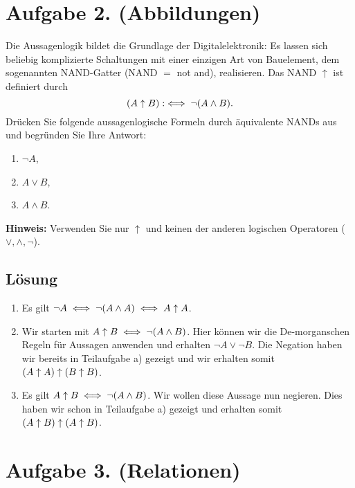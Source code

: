 \documentclass[german,12pt]{homework}
\DeclarePairedDelimiter{\enbrace}{(}{)}
\begin{document}
    \section*{Aufgabe 2. (Abbildungen)}

    \begin{problem}
        Die Aussagenlogik bildet die Grundlage der Digitalelektronik: Es lassen sich beliebig komplizierte Schaltungen mit einer einzigen Art von Bauelement, dem sogenannten NAND-Gatter (NAND \(=\) not and), realisieren. Das NAND \(\uparrow\) ist definiert durch
        \[\enbrace*{A \uparrow B} :\iff \lnot\enbrace*{A \land B}.\]
        Drücken Sie folgende aussagenlogische Formeln durch äquivalente NANDs aus und begründen Sie Ihre Antwort:
        \begin{enumerate}
            \item \({\lnot}A\),
            \item \(A \lor B\),
            \item \(A \land B\).
        \end{enumerate}

        \textbf{Hinweis:} \quad Verwenden Sie nur \(\uparrow\) und keinen der anderen logischen Operatoren (\(\lor, \land, \lnot\)).
    \end{problem}

    \subsection*{Lösung}
    \begin{enumerate}
        \item Es gilt \(\lnot{A} \iff \lnot\enbrace*{A \land A} \iff A \uparrow A\).
        \item Wir starten mit \(A \uparrow B \iff \lnot\enbrace*{A \land B}\). Hier können wir die De-morganschen Regeln für Aussagen anwenden und erhalten \(\lnot{A} \lor \lnot{B}\). Die Negation haben wir bereits in Teilaufgabe a) gezeigt und wir erhalten somit \(\enbrace*{A \uparrow A} \uparrow \enbrace*{B \uparrow B}\).
        \item Es gilt \(A \uparrow B \iff \lnot\enbrace*{A \land B}\). Wir wollen diese Aussage nun negieren. Dies haben wir schon in Teilaufgabe a) gezeigt und erhalten somit \(\enbrace*{A \uparrow B} \uparrow \enbrace*{A \uparrow B}\).
    \end{enumerate}

    \section*{Aufgabe 3. (Relationen)}
\end{document}
